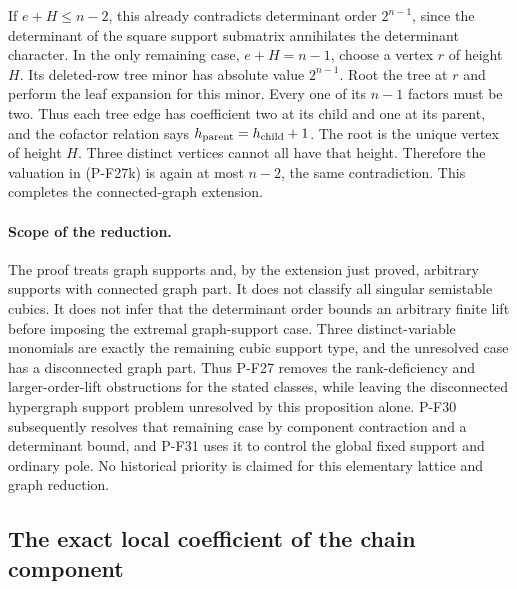 If $e+H\le n-2$, this already contradicts determinant order
$2^{n-1}$, since the determinant of the square support submatrix
annihilates the determinant character. In the only remaining case,
$e+H=n-1$, choose a vertex $r$ of height $H$. Its deleted-row tree
minor has absolute value $2^{n-1}$. Root the tree at $r$ and perform
the leaf expansion for this minor. Every one of its $n-1$ factors
must be two. Thus each tree edge has coefficient two at its child
and one at its parent, and the cofactor relation says
$h_{\rm parent}=h_{\rm child}+1$. The root is the unique vertex of
height $H$. Three distinct vertices cannot all have that height.
Therefore the valuation in (P-F27k) is again at most $n-2$, the
same contradiction. This completes the connected-graph extension.

\paragraph{Scope of the reduction.}
The proof treats graph supports and, by the extension just proved,
arbitrary supports with connected graph part. It does not classify
all singular semistable cubics. It does not infer
that the determinant order bounds an arbitrary finite lift
before imposing the extremal graph-support case. Three
distinct-variable monomials are exactly the remaining
cubic support type, and the unresolved case has a disconnected
graph part. Thus P-F27 removes the rank-deficiency and
larger-order-lift obstructions for the stated classes, while
leaving the disconnected hypergraph support problem unresolved by
this proposition alone. P-F30 subsequently resolves that remaining
case by component contraction and a determinant bound, and P-F31
uses it to control the global fixed support and ordinary pole.
No historical priority is claimed for this elementary
lattice and graph reduction.



\subsection{The exact local coefficient of the chain component}

